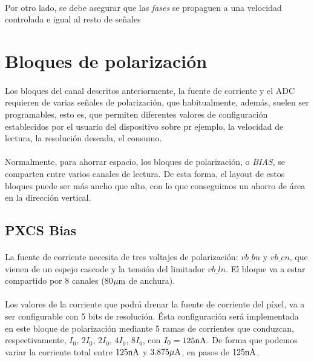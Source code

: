 \paragraph{}
Por otro lado, se debe asegurar que las \textit{fases} se propaguen a una velocidad
controlada e igual al resto de señales

\section{Bloques de polarización}\label{cap:ro_sch_bias}

\paragraph{}
Los bloques del canal descritos anteriormente, la fuente de corriente y el ADC
requieren de varias señales de polarización, que habitualmente, además, suelen
ser programables, esto es, que permiten diferentes valores de configuración
establecidos por el usuario del dispositivo sobre pr ejemplo, la velocidad de
lectura, la resolución deseada, el consumo.

\paragraph{}
Normalmente, para ahorrar espacio, los bloques de polarización, o \textit{BIAS},
se comparten entre varios canales de lectura. De esta forma, el layout de estos
bloques puede ser más ancho que alto, con lo que conseguimos un ahorro de área en
la dirección vertical.

\subsection{PXCS Bias}

\paragraph{}
La fuente de corriente necesita de tres voltajes de polarización: $vb\_bn$ y
$vb\_cn$, que vienen de un espejo cascode y la tensión del limitador $vb\_ln$.
El bloque va a estar compartido por 8 canales (80$\mu\text{m}$ de anchura).

\paragraph{}
Los valores de la corriente que podrá drenar la fuente de corriente del píxel, va
a ser configurable con 5 bits de resolución. Ésta configuración será implementada
en este bloque de polarización mediante 5 ramas de corrientes que conduzcan,
respectivamente, $I_0$, $2I_0$, $2I_0$, $4I_0$, $8I_0$, con
$I_0=125\text{nA}$. De forma que podemos variar la corriente total entre $125\text{nA}$ y
$3.875\mu\text{A}$, en pasos de $125\text{nA}$.

